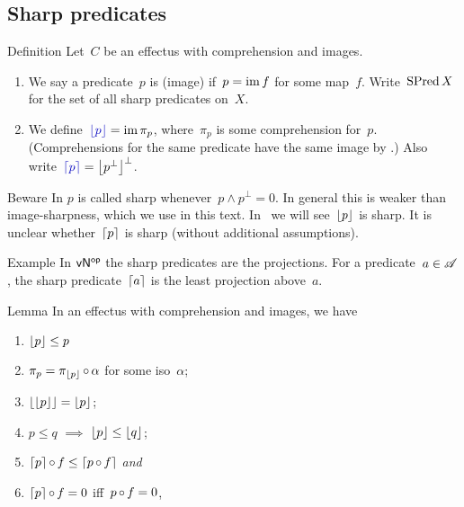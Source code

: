 \documentclass[b]{subfiles}
\begin{document}
\subsection{Sharp predicates}
\begin{parsec}%
\begin{point}{Definition}%
Let~$C$ be an effectus with comprehension and images.
\begin{enumerate}
\item
    We say a predicate~$p$ is (image) 
        if~$p = \operatorname{im} f$ for some map~$f$.
    Write~$\operatorname{SPred} X$ for the set of all sharp predicates on~$X$.
\item
We define~$\Define{\floor{p}} = \IM \pi_p$,
    where~$\pi_p$ is some comprehension for~$p$.
(Comprehensions for the same predicate have the same image
    by .)
Also write~$\Define{\ceil{p}} = \floor{p^\perp}^\perp$.
\end{enumerate}
\begin{point}{Beware}%
In  $p$ is called sharp whenever~$p \wedge p^\perp=0$.
In general this is weaker than image-sharpness, which we use in this text.
In~
    we will see~$\left\lfloor p\right\rfloor$ is sharp.
It is unclear whether~$\left\lceil p\right\rceil$ is sharp (without additional
    assumptions).
\end{point}
\end{point}
\begin{point}{Example}%
In ${\mathsf{vN}}{^{\mathsf{op}}}$ the sharp predicates are the projections.
For a predicate~$a \in \mathscr{A}$,
    the sharp predicate~$\left\lceil a\right\rceil$
    is the least projection above~$a$.
\end{point}
\begin{point}{Lemma}%
In an effectus with comprehension and images, we have
\begin{multicols}{2}
\begin{enumerate}
\item
    $\left\lfloor p\right\rfloor \leq p$
\item
    $\pi_p = \pi_{\left\lfloor p\right\rfloor} \mathop{\circ} \alpha$
        for some iso~$\alpha$;
\item
    $\left\lfloor\left\lfloor p\right\rfloor\right\rfloor = \left\lfloor p\right\rfloor$;
\item
    $p \leq q$ $\implies$ $\left\lfloor p\right\rfloor \leq \left\lfloor q\right\rfloor$;
\item
    $\left\lceil p\right\rceil \mathop{\circ} f \leq \left\lceil p \mathop{\circ} f\right\rceil$ \emph{and}
\item
    $\left\lceil p\right\rceil \mathop{\circ} f =0$ iff~$p \mathop{\circ} f = 0$,
\end{enumerate}
\end{multicols}

\end{point}
\end{parsec}
\end{document}
